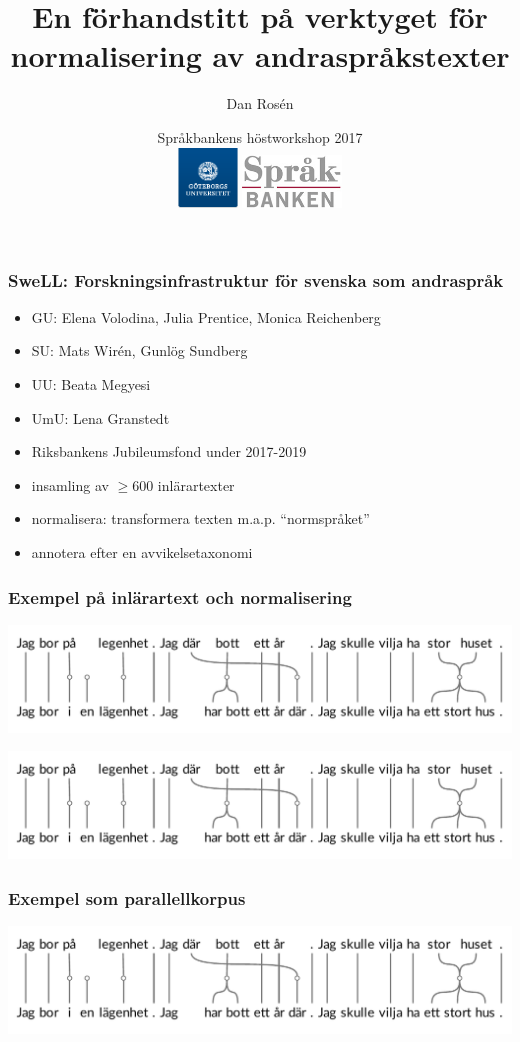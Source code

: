 \documentclass[ignorenonframetext,]{beamer}
\title{\Large
En förhandstitt på verktyget för \\ normalisering av andraspråkstexter
}
\author{\large Dan Rosén \\
}
\date{\large Språkbankens höstworkshop 2017
  \vspace{1cm}
  \\
  \includegraphics[height=1.6cm]{logo_gu.png}
  \hspace{5cm}
  \includegraphics[height=1.4cm]{logo_sb.jpg}
}
\begin{document}
\frame{\titlepage}


\begin{frame}
\frametitle{SweLL:
Forskningsinfrastruktur för svenska som andraspråk}
\begin{itemize}
\item GU: Elena Volodina, Julia Prentice, Monica Reichenberg
\item SU: Mats Wirén, Gunlög Sundberg
\item UU: Beata Megyesi
\item UmU: Lena Granstedt
\item Riksbankens Jubileumsfond under 2017-2019
\vspace{\baselineskip}
\item insamling av $\geq$600 inlärartexter
\item normalisera: transformera texten m.a.p. ``normspråket''
\item annotera efter en avvikelsetaxonomi
\end{itemize}
\end{frame}

\begin{frame}
\frametitle{Exempel på inlärartext och normalisering}
\includegraphics[width=\textwidth, trim={0 3.3cm 0 0}, clip]{ladder_black.pdf}
\pause
\vspace{0.66cm}

\includegraphics[width=\textwidth, trim={0 0 0 3.3cm}, clip]{ladder_black.pdf}
\end{frame}

\begin{frame}
\frametitle{Exempel som parallellkorpus}
\includegraphics[width=\textwidth]{ladder_black.pdf}
\end{frame}
\end{document}
